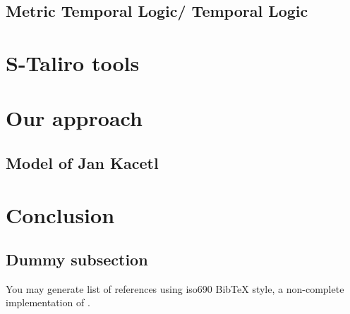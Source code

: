 \documentclass[english,technical,10pt]{FITreport}[2018/01/26]
\begin{document}
\subsection{Metric Temporal Logic/ Temporal Logic}

\section{S-Taliro tools}

\section{Our approach}

\subsection{Model of Jan Kacetl}

\section{Conclusion}

\subsection{Dummy subsection}

You may generate list of references using iso690 Bib\TeX{} style, a non-complete implementation of \cite{iso690}.



    
\end{document}
